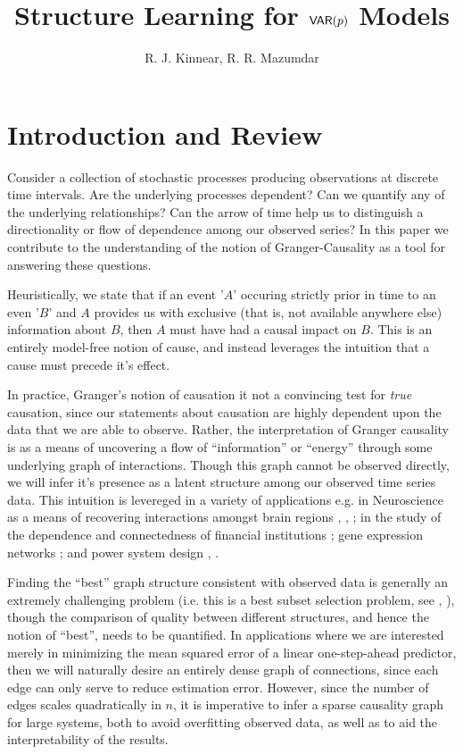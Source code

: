 \documentclass[12pt]{article}
\title{Structure Learning for $\mathsf{VAR}(p)$ Models}
\author{R. J. Kinnear, R. R. Mazumdar}
\begin{document}
\maketitle
{}

\section{Introduction and Review}
\label{sec:introduction}
Consider a collection of stochastic processes producing observations
at discrete time intervals.  Are the underlying processes dependent?
Can we quantify any of the underlying relationships?  Can the arrow of
time help us to distinguish a directionality or flow of dependence
among our observed series?  In this paper we contribute to the
understanding of the notion of Granger-Causality
\cite{granger1969investigating} \cite{Granger1980329} as a tool for
answering these questions.

Heuristically, we state that if an event '$A$' occuring strictly prior
in time to an even '$B$' and $A$ provides us with exclusive (that is,
not available anywhere else) information about $B$, then $A$ must have
had a causal impact on $B$.  This is an entirely model-free notion of
cause, and instead leverages the intuition that a cause must precede
it's effect.

In practice, Granger's notion of causation it not a convincing test
for \textit{true} causation, since our statements about causation are
highly dependent upon the data that we are able to observe.  Rather,
the interpretation of Granger causality is as a means of uncovering a
flow of ``information'' or ``energy'' through some underlying graph of
interactions.  Though this graph cannot be observed directly, we will
infer it's presence as a latent structure among our observed time
series data.  This intuition is levereged in a variety of applications
e.g. in Neuroscience as a means of recovering interactions amongst
brain regions \cite{bressler2011wiener}, \cite{anna_paper2008},
\cite{david2008identifying}; in the study of the dependence and
connectedness of financial institutions \cite{NBERw16223}; gene
expression networks \cite{Fujita2007}; and power system design
\cite{Misyrlis2016450}, \cite{yuan2014root}.

Finding the ``best'' graph structure consistent with observed data is
generally an extremely challenging problem (i.e. this is a best subset
selection problem, see \cite{bss_mio}, \cite{hastie_bss_comp}), though
the comparison of quality between different structures, and hence the
notion of ``best'', needs to be quantified.  In applications where we
are interested merely in minimizing the mean squared error of a linear
one-step-ahead predictor, then we will naturally desire an entirely
dense graph of connections, since each edge can only serve to reduce
estimation error.  However, since the number of edges scales
quadratically in $n$, it is imperative to infer a sparse causality
graph for large systems, both to avoid overfitting observed data, as
well as to aid the interpretability of the results.
\end{document}

